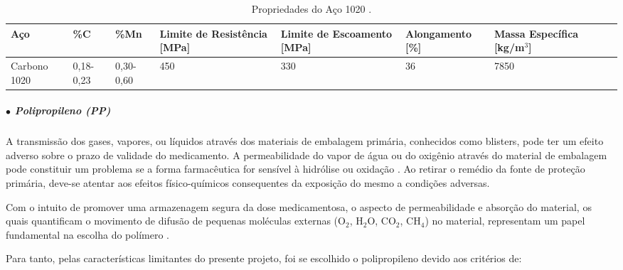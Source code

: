 \begin{table}[H]
    \centering
    \caption{Propriedades do Aço 1020 \cite{Askeland_Wright_2019}.}
    \label{tab:PropA1020}
    \begin{adjustbox}{max width = \textwidth}
        \begin{tabular}{|C{2cm}|C{2cm}|C{2cm}|C{3cm}|C{3cm}|C{3cm}|C{2.8cm}|C{2cm}|C{3cm}|}
            \hline
            \textbf{Aço } & \textbf{\%C} & \textbf{\%Mn} & \textbf{Limite de Resistência [MPa]} & \textbf{Limite de Escoamento [MPa]} & \textbf{Alongamento [\%]} &
            \textbf{Massa Específica [kg/m$^3$]} \\ \hline
            
              Carbono 1020 & 0,18-0,23 & 0,30-0,60 & 450  & 330 & 36 & 7850
             \\ \hline
            
        \end{tabular}
    \end{adjustbox}
\end{table}



\subparagraph*{$\bullet$ Polipropileno (PP)}\hfill 

 A transmissão dos gases, vapores, ou líquidos através dos materiais de embalagem primária, conhecidos como blisters, pode ter um efeito adverso sobre o prazo de validade do medicamento. A permeabilidade do vapor de água ou do oxigênio através do material de embalagem pode constituir um problema se a forma farmacêutica for sensível à hidrólise ou oxidação \cite{embalagem}. Ao retirar o remédio da fonte de proteção primária, deve-se atentar aos efeitos físico-químicos consequentes da exposição do mesmo a condições adversas. 

Com o intuito de promover uma armazenagem segura da dose medicamentosa, o aspecto de permeabilidade e absorção do material, os quais quantificam o movimento de difusão de pequenas moléculas externas (O$_2$, H$_2$O, CO$_2$, CH$_4$) no material, representam um papel fundamental na escolha do polímero \cite{materiais}.  

Para tanto, pelas características limitantes do presente projeto, foi se escolhido o polipropileno devido aos critérios de: 

